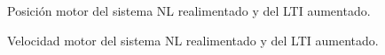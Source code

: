 \documentclass[a4paper, 10pt, onecolumn,journal]{ieeeconf}
\begin{document}
\begin{figure}[H]
	\centering
	\begin{adjustbox}{max width=\columnwidth}
	\end{adjustbox}
	\caption{Posición motor del sistema NL realimentado y del LTI aumentado.}
	\label{Posición motor del sistema NL realimentado y del LTI aumentado}
\end{figure}
\begin{figure}[H]
	\centering
	\begin{adjustbox}{max width=\columnwidth}
	\end{adjustbox}
	\caption{Velocidad motor del sistema NL realimentado y del LTI aumentado.}
	\label{Velocidad motor del sistema NL realimentado y del LTI aumentado}
\end{figure}
\end{document}
